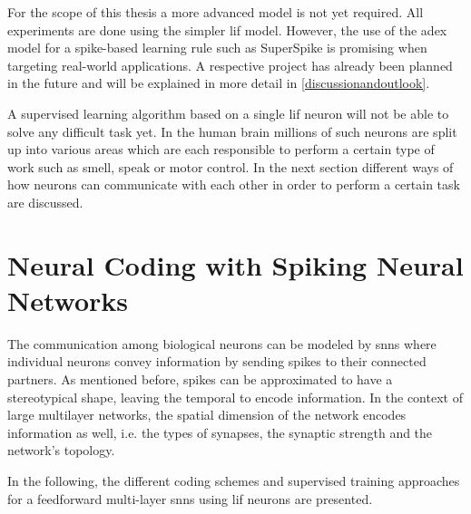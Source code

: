 For the scope of this thesis a more advanced model is not yet required. All experiments are done using the simpler \gls{lif} model. However, the use of the \gls{adex} model for a spike-based learning rule such as SuperSpike is promising when targeting real-world applications. A respective project has already been planned in the future and will be explained in more detail in \cref{discussionandoutlook}.

A supervised learning algorithm based on a single \gls{lif} neuron will not be able to solve any difficult task yet. In the human brain millions of such neurons are split up into various areas which are each responsible to perform a certain type of work such as smell, speak or motor control. In the next section different ways of how neurons can communicate with each other in order to perform a certain task are discussed.

\section{Neural Coding with Spiking Neural Networks}
\label{neuralcoding}
The communication among biological neurons can be modeled by \glspl{snn} where individual neurons convey information by sending spikes to their connected partners. As mentioned before, spikes can be approximated to have a stereotypical shape, leaving the temporal to encode information. In the context of large multilayer networks, the spatial dimension of the network encodes information as well, i.e. the types of synapses, the synaptic strength and the network's topology.


In the following, the different coding schemes and supervised training approaches for a feedforward multi-layer \glspl{snn} using \gls{lif} neurons are presented.

